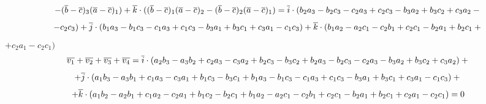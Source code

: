 \documentclass[11pt]{article}
\begin{document}
    \[ -(\overline{b}-\overline{c})_3(\overline{a}-\overline{c})_1) + \overline{k} \cdot((\overline{b}-\overline{c})_1(\overline{a}-\overline{c})_2-(\overline{b}-\overline{c})_2(\overline{a}-\overline{c})_1) = \overline{i}\cdot(b_2a_3-b_2c_3-c_2a_3+c_2c_3-b_3a_2+b_3c_2+c_3a_2- \newline \]
    \[ -c_2c_3)+\overline{j}\cdot(b_1a_3-b_1c_3-c_1a_3+c_1c_3-b_3a_1+b_3c_1+c_3a_1-c_1c_3)+\overline{k}\cdot(b_1a_2-a_2c_1-c_2b_1+c_2c_1-b_2a_1+b_2c_1+ \newline\]
    \( +c_2a_1-c_2c_1)  \)
    \[ \overline{v_1}+\overline{v_2}+\overline{v_3}+\overline{v_4}=\overline{i}\cdot(a_2b_3 - a_3b_2+c_2a_3 - c_3a_2+b_2c_3 - b_3c_2+b_2a_3-b_2c_3-c_2a_3-b_3a_2+b_3c_2+c_3a_2)+ \newline \]
    \[ +\overline{j}\cdot(a_1b_3 - a_3b_1+c_1a_3 - c_3a_1+b_1c_3 - b_3c_1+b_1a_3-b_1c_3-c_1a_3+c_1c_3-b_3a_1+b_3c_1+c_3a_1-c_1c_3)+ \newline \]
    \[ +\overline{k}\cdot(a_1b_2-a_2b_1+c_1a_2-c_2a_1+b_1c_2-b_2c_1+b_1a_2-a_2c_1-c_2b_1+c_2c_1-b_2a_1+b_2c_1+c_2a_1-c_2c_1)=0  \newline\]
\end{document}
